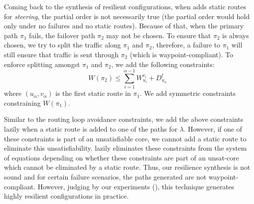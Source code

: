 

Coming back to the synthesis of resilient configurations,
when \name adds static routes for \emph{steering},  
the partial order  is not necessarily true 
(the partial order would hold only under no failures and 
no static routes). 
Because of that, when the primary path $\pi_1$ fails, the 
failover path $\pi_2$ may not be chosen. To ensure that 
$\pi_2$ is always chosen, we try to split the traffic
along $\pi_1$ and $\pi_2$, therefore, a failure to $\pi_1$
will still ensure that traffic is sent through $\pi_2$ 
(which is waypoint-compliant). To enforce splitting amongst
$\pi_1$ and $\pi_2$, we add the following constraints: 
\begin{equation}
	W(\pi_2) \leq \sum_{i=1}^{\alpha - 1} W_{u_i}^{v_i} + D_{u_\alpha}^t	
\end{equation}
where $(u_\alpha, v_\alpha)$ is the first static route in $\pi_1$.
We add symmetric constraints constraining $W(\pi_1)$. 

Similar to the routing loop avoidance constraints, we add the
above constraints lazily when a static route is added to one of the
paths for $\lambda$. However, if one of these constraints is part of 
an unsatisfiable core, we cannot add a static route to eliminate 
this unsatisfiability. \name lazily eliminates these constraints from the
system of equations depending on whether these constraints are part of 
an unsat-core which cannot be eliminated by a static route. Thus, 
our resilience synthesis is not sound and for certain failure scenarios, 
the paths generated are not waypoint-compliant. However, 
judging by our experiments (), 
this technique generates highly resilient configurations 
in practice. 
